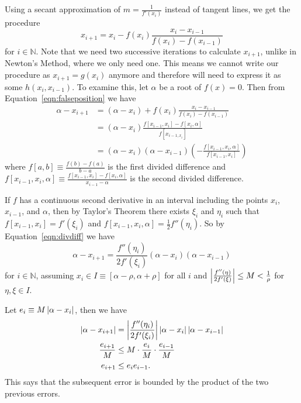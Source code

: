\documentclass[12pt,letterpaper,DIV=11]{scrartcl}
\theoremstyle{plain}
\theoremstyle{definition}
\theoremstyle{remark}
\begin{document}
Using a secant approximation of $m = \frac{1}{f'(x_i)}$ instead of tangent lines,
we get the procedure \begin{equation}\label{eqn:falseposition}
  x_{i + 1} = x_i - f(x_i) \frac{x_i - x_{i - 1}}{f(x_i) - f(x_{i - 1})}
\end{equation} for $i \in \mathbb{N}$.
Note that we need two successive iterations to calculate $x_{i + 1}$, unlike in Newton's Method, where we only need one.
This means we cannot write our procedure as $x_{i + 1} = g(x_i)$ anymore and therefore will need to express it as some $h(x_i, x_{i - 1})$.
To examine this, let $\alpha$ be a root of $f(x) = 0$.
Then from Equation~\ref{eqn:falseposition} we have \begin{equation}
  \begin{split}\label{eqn:divdiff}
    \alpha - x_{i + 1} &= \left( \alpha - x_i \right) + f(x_i) \frac{x_i - x_{i - 1}}{f(x_i) - f(x_{i - 1})} \\
                       &= \left( \alpha - x_i \right) \frac{f[x_{i - 1}, x_i] - f[x_i, \alpha]}{f[x_{i - 1, x_i}]} \\
                       &= (\alpha - x_i) (\alpha - x_{i - 1}) \left( - \frac{f[x_{i - 1}, x_i, \alpha]}{f[x_{i - 1}, x_i]} \right)
  \end{split}
\end{equation}
where $f[a, b] \equiv \frac{f(b) - f(a)}{b - a}$ is the first divided difference and $f[x_{i - 1}, x_i, \alpha] \equiv \frac{f[x_{i - 1}, x_i] - f[x_i, \alpha]}{x_{i - 1} - \alpha}$ is the second divided difference.

If $f$ has a continuous second derivative in an interval including the points $x_i$, $x_{i - 1}$, and $\alpha$, then by Taylor's Theorem there exists $\xi_i$ and $\eta_i$  such that $f[x_{i - 1}, x_i] = f'(\xi_i)$ and $f[x_{i - 1}, x_i, \alpha] = \frac{1}{2} f''(\eta_i)$.
So by Equation~\ref{eqn:divdiff} we have \begin{displaymath}
  \alpha - x_{i + 1} = \frac{f''(\eta_i)}{2 f'(\xi_i)} (\alpha - x_i) (\alpha - x_{i - 1})
\end{displaymath} for $i \in \mathbb{N}$,
assuming $x_i \in I \equiv [\alpha - \rho, \alpha + \rho]$ for all $i$ and
$\left\lvert\frac{f''(\eta)}{2 f'(\xi)}\right\rvert \leq M < \frac{1}{\rho}$ for $\eta, \xi \in I$.

Let $e_i \equiv M \left\lvert\alpha - x_i\right\rvert$, then we have \begin{align*}
  \left\lvert\alpha - x_{i + 1}\right\rvert &= \left\lvert\frac{f''(\eta_i)}{2 f'(\xi_i)}\right\rvert \left\lvert\alpha - x_i\right\rvert \left\lvert\alpha - x_{i - 1}\right\rvert \\
  \frac{e_{i + 1}}{M} &\leq M \cdot \frac{e_i}{M} \cdot \frac{e_{i - 1}}{M} \\
  e_{i + 1} &\leq e_i e_{i - 1}.
\end{align*}
This says that the subsequent error is bounded by the product of the two previous errors.
\end{document}
